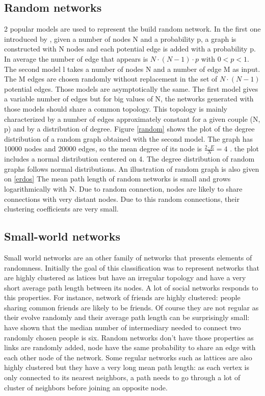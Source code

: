 \documentclass[a4paper, 12pt]{report}
\begin{document}
\subsection{Random networks}
\label{random-section}
2 popular models are used to represent the build random network. In the first one introduced by \cite{erdosRandom}, given a number of nodes N and a probability p, a graph is constructed with N nodes and each potential edge is added with a probability p. In average the number of edge that appears is $N \cdot (N-1) \cdot p$ with $ 0< p <1$. The second model \citep{gilbertRandom} l takes a number of nodes N and a number of edge M as input. The M edges are chosen randomly without replacement in the set of $N \cdot (N-1)$ potential edges. Those models are asymptotically the same. The first model gives a variable number of edges but for big values of N, the networks generated with those models should share a common topology. This topology is mainly characterized by a number of edges approximately constant for a given couple (N, p) and by a distribution of degree. Figure \ref{random} shows the plot of the degree distribution of a random graph obtained with the second model. The graph has 10000 nodes and 20000 edges, so the mean degree of its node is  $\frac{2 \cdot E}{N} = 4$ . the plot includes a normal distribution centered on 4. The degree distribution of random graphs follows normal distributions.  An illustration of random graph is also given on \ref{erdos} The mean path length of random networks is small and grows logarithmically with N. Due to random connection, nodes are likely to share connections with very distant nodes. Due to this random connections, their clustering coefficients are very small.\\

\subsection{Small-world networks}
\label{sm-section}
Small world networks are an other family of networks that presents elements of randomness. Initially the goal of this classification was to represent networks that are highly clustered as latices but have an irregular topology and have a very short average path length between its nodes. A lot of social networks responds to this properties. For instance, network of friends are highly clustered: people sharing common friends are likely to be friends. Of course they are not regular as their evolve randomly and their average path length can be surprisingly small: \cite{milgram} have shown that the median number of intermediary needed to connect two randomly chosen people is six. Random networks don't have those properties as links are randomly added, node have the same probability to share an edge with each other node of the network. Some regular networks such as lattices are also highly clustered but they have a very long mean path length: as each vertex is only connected to its nearest neighbors, a path needs to go through a lot of cluster of neighbors before joining an opposite node. \citep{complex_networks} \\
\end{document}
